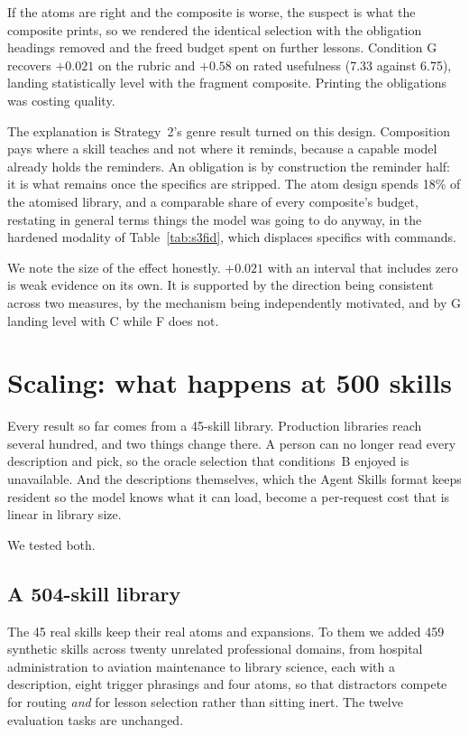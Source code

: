 \documentclass[11pt]{article}
\begin{document}
If the atoms are right and the composite is worse, the suspect is what the composite prints, so we
rendered the identical selection with the obligation headings removed and the freed budget spent on
further lessons. Condition G recovers $+0.021$ on the rubric and $+0.58$ on rated usefulness (7.33
against 6.75), landing statistically level with the fragment composite. Printing the obligations
was costing quality.

The explanation is Strategy~2's genre result turned on this design. Composition pays where a skill
teaches and not where it reminds, because a capable model already holds the reminders. An obligation
is by construction the reminder half: it is what remains once the specifics are stripped. The atom
design spends 18\% of the atomised library, and a comparable share of every composite's budget,
restating in general terms things the model was going to do anyway, in the hardened modality of
Table~\ref{tab:s3fid}, which displaces specifics with commands.

We note the size of the effect honestly. $+0.021$ with an interval that includes zero is weak
evidence on its own. It is supported by the direction being consistent across two measures, by the
mechanism being independently motivated, and by G landing level with C while F does not.

\section{Scaling: what happens at 500 skills}
\label{sec:scale}

Every result so far comes from a 45-skill library. Production libraries reach several hundred, and
two things change there. A person can no longer read every description and pick, so the oracle
selection that conditions~B enjoyed is unavailable. And the descriptions themselves, which the
Agent Skills format keeps resident so the model knows what it can load, become a per-request cost
that is linear in library size.

We tested both.

\subsection{A 504-skill library}

The 45 real skills keep their real atoms and expansions. To them we added 459 synthetic skills
across twenty unrelated professional domains, from hospital administration to aviation maintenance
to library science, each with a description, eight trigger phrasings and four atoms, so that
distractors compete for routing \emph{and} for lesson selection rather than sitting inert. The
twelve evaluation tasks are unchanged.
\end{document}
